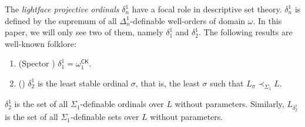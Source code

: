 \documentclass{mhkr}
\newcommand{\CK}{\mathsf{CK}}
\begin{document}
The \emph{lightface projective ordinals} $\delta^1_n$ have a focal role in descriptive set theory. $\delta^1_n$ is defined by the supremum of all $\Delta^1_n$-definable well-orders of domain $\omega$. In this paper, we will only see two of them, namely $\delta^1_1$ and $\delta^1_2$.
The following results are well-known folklore:
\begin{proposition} \phantom{a} \label{Proposition: Characterizing delta 1 n} \pushQED{\qed}
    \begin{enumerate}
        \item (Spector \cite{Spector1955RecursiveWO}) $\delta^1_1=\omega_1^\CK$.
        \item (\cite[Corollary V.8.3]{Barwise1975}) $\delta^1_2$ is the least stable ordinal $\sigma$, that is, the least $\sigma$ such that $L_\sigma\prec_{\Sigma_1} L$. \qedhere 
    \end{enumerate}
\end{proposition}

\begin{proposition}
    \pushQED{\qed}
    \label{Proposition: Set theoretic characterization of delta 1 2}
    $\delta^1_2$ is the set of all $\Sigma_1$-definable ordinals over $L$ without parameters. Similarly, $L_{\delta^1_2}$ is the set of all $\Sigma_1$-definable sets over $L$ without parameters. \qedhere 
\end{proposition}
\end{document}
